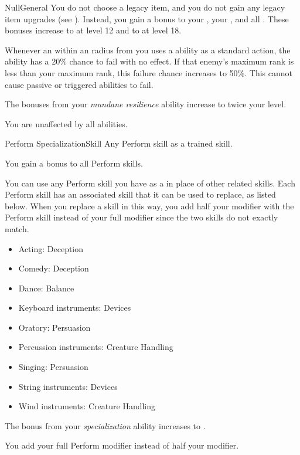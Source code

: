 \begin{feat}{Null}{General}
     You do not choose a legacy item, and you do not gain any legacy item upgrades (see ).
    Instead, you gain a  bonus to your , your , and all .
    These bonuses increase to  at level 12 and to  at level 18.

     Whenever an  within an \smallarea radius from you uses a \magical ability as a standard action, the ability has a 20\% chance to fail with no effect.
    If that enemy's maximum rank is less than your maximum rank, this failure chance increases to 50\%.
    This cannot cause passive or triggered abilities to fail.

     The bonuses from your \textit{mundane resilience} ability increase to twice your level.

     You are unaffected by all \magical abilities.
  \end{feat}

  \begin{feat}{Perform Specialization}{Skill}
    \featpre Any Perform skill as a trained skill.

     You gain a  bonus to all Perform skills.

     You can use any Perform skill you have as a  in place of other related skills.
    Each Perform skill has an associated skill that it can be used to replace, as listed below.
    When you replace a skill in this way, you add half your modifier with the Perform skill instead of your full modifier since the two skills do not exactly match.
    \begin{itemize}
      \item Acting: Deception
      \item Comedy: Deception
      \item Dance: Balance
      \item Keyboard instruments: Devices
      \item Oratory: Persuasion
      \item Percussion instruments: Creature Handling
      \item Singing: Persuasion
      \item String instruments: Devices
      \item Wind instruments: Creature Handling
    \end{itemize}

     The bonus from your \textit{specialization} ability increases to .

     You add your full Perform modifier instead of half your modifier.
  \end{feat}


